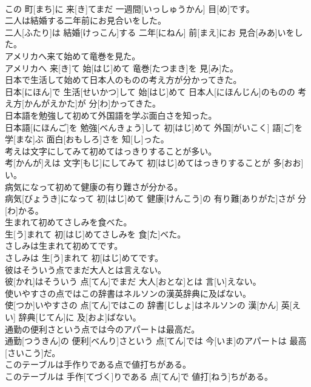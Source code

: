 \documentclass[8pt]{extreport}
\begin{document}
\begin{CJK}{UTF8}{min}
\\	この 町[まち]に 来[き]てまだ 一週間[いっしゅうかん] 目[め]です。
\\	二人は結婚する二年前にお見合いをした。	
\\	二人[ふたり]は 結婚[けっこん]する 二年[にねん] 前[まえ]にお 見合[みあ]いをした。
\\	アメリカへ来て始めて竜巻を見た。	
\\	アメリカへ 来[き]て 始[はじ]めて 竜巻[たつまき]を 見[み]た。
\\	日本で生活して始めて日本人のものの考え方が分かってきた。	
\\	日本[にほん]で 生活[せいかつ]して 始[はじ]めて 日本人[にほんじん]のものの 考え方[かんがえかた]が 分[わ]かってきた。
\\	日本語を勉強して初めて外国語を学ぶ面白さを知った。	
\\	日本語[にほんご]を 勉強[べんきょう]して 初[はじ]めて 外国[がいこく] 語[ご]を 学[まな]ぶ 面白[おもしろ]さを 知[し]った。
\\	考えは文字にしてみて初めてはっきりすることが多い。	
\\	考[かんが]えは 文字[もじ]にしてみて 初[はじ]めてはっきりすることが 多[おお]い。
\\	病気になって初めて健康の有り難さが分かる。	
\\	病気[びょうき]になって 初[はじ]めて 健康[けんこう]の 有り難[ありがた]さが 分[わ]かる。
\\	生まれて初めてさしみを食べた。	
\\	生[う]まれて 初[はじ]めてさしみを 食[た]べた。
\\	さしみは生まれて初めてです。	
\\	さしみは 生[う]まれて 初[はじ]めてです。
\\	彼はそういう点でまだ大人とは言えない。	
\\	彼[かれ]はそういう 点[てん]でまだ 大人[おとな]とは 言[い]えない。
\\	使いやすさの点ではこの辞書はネルソンの漢英辞典に及ばない。	
\\	使[つか]いやすさの 点[てん]ではこの 辞書[じしょ]はネルソンの 漢[かん] 英[えい] 辞典[じてん]に 及[およ]ばない。
\\	通勤の便利さという点では今のアパートは最高だ。	
\\	通勤[つうきん]の 便利[べんり]さという 点[てん]では 今[いま]のアパートは 最高[さいこう]だ。
\\	このテーブルは手作りである点で値打ちがある。	
\\	このテーブルは 手作[てづく]りである 点[てん]で 値打[ねう]ちがある。

\end{CJK}
\end{document}
